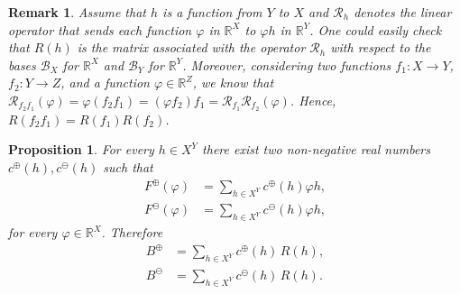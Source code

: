 \documentclass[11pt]{article}
\newcommand{\R}{\mathbb{R}}
\newcommand{\p}{\varphi}
\newtheorem{proposition}[theorem]{Proposition}
\newtheorem{rem}[theorem]{Remark}
\begin{document}
\begin{rem}\label{grhughaepj}
Assume that $h$ is a function from $Y$ to $X$ and $\mathcal{R}_h$ denotes the linear operator that sends each function $\varphi$ in $\R^X$ to $\varphi h$ in $\R^Y$. One could easily check that $R(h)$ is the matrix associated with the operator $\mathcal{R}_h$ with respect to the bases $\mathcal{B}_X$ for $\R^X$ and $\mathcal{B}_Y$ for $\R^Y$. 
Moreover, considering two functions ${f_1} \colon X \to Y$, ${f_2} \colon Y \to Z$, and a function $\p\in \R^Z$, we know that $\mathcal{R}_{{f_2} {f_1}}(\varphi)= \varphi ({f_2} {f_1}) = (\varphi {f_2}) {f_1} = \mathcal{R}_{f_1} \mathcal{R}_{f_2}(\varphi)$. Hence, $ R({f_2}{f_1})=R({f_1}) R({f_2})$.
\end{rem}

\begin{proposition}
\label{prop:sum}
    For every $h \in X^Y$ there exist two non-negative real numbers $c^\oplus(h), c^\ominus(h)$ such that
    \begin{align*}
    F^\oplus(\varphi) & = \sum_{h \in X^Y}c^\oplus(h) \varphi h, \\
    F^\ominus(\varphi) & = \sum_{h \in X^Y}c^\ominus(h) \varphi h,
    \end{align*}
    for every $\varphi \in \R^X$.
    Therefore  
\begin{align*}
    B^\oplus & = \sum_{h \in X^Y} c^\oplus(h)\, R(h), \\
    B^\ominus & = \sum_{h \in X^Y} c^\ominus(h)\, R(h).
\end{align*}
\end{proposition}
\end{document}
